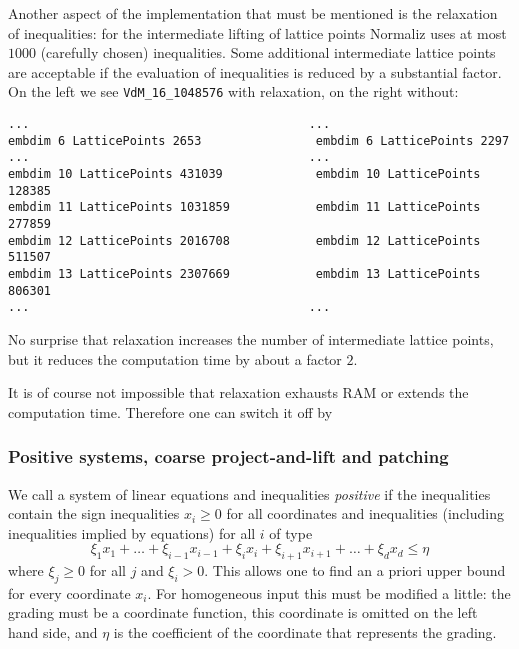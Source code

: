 Another aspect of the implementation that must be mentioned is the relaxation of inequalities: for the intermediate lifting of lattice points Normaliz uses at most $1000$ (carefully chosen) inequalities. Some additional intermediate lattice points are acceptable if the evaluation of inequalities is reduced by a substantial factor. On the left we see \verb|VdM_16_1048576| with relaxation, on the right without:
\begin{Verbatim}
...                                       ...
embdim 6 LatticePoints 2653                embdim 6 LatticePoints 2297
...                                       ...
embdim 10 LatticePoints 431039             embdim 10 LatticePoints 128385
embdim 11 LatticePoints 1031859            embdim 11 LatticePoints 277859
embdim 12 LatticePoints 2016708            embdim 12 LatticePoints 511507
embdim 13 LatticePoints 2307669            embdim 13 LatticePoints 806301
...                                       ...
\end{Verbatim}
No surprise that relaxation increases the number of intermediate lattice points, but it reduces the computation time by about a factor $2$.

It is of course not impossible that relaxation exhausts RAM or extends the computation time. Therefore one can switch it off by
\begin{itemize}
	\itemtt[NoRelax]
\end{itemize}

\subsubsection{Positive systems, coarse project-and-lift and patching}\label{positive_systems}

We call a system of linear equations and inequalities \emph{positive} if the inequalities contain the sign inequalities $x_i \ge 0$ for all coordinates and inequalities (including inequalities implied by equations) for all $i$ of type
\begin{equation}
\xi_1x_1 + \dots + \xi_{i-1}x_{i-1} + \xi_i x_i +  \xi_{i+1}x_{i+1} +\dots +  \xi_{d}x_{d} \le \eta \label{upper_bound}
\end{equation}
where $\xi_j \ge 0$ for all $j$ and $\xi_i >0$. This allows one to find an a priori upper bound for every coordinate $x_i$. For homogeneous input this must be modified a little: the grading must be a coordinate function, this coordinate is omitted on the left hand side, and $\eta$ is the coefficient of the coordinate that represents the grading.

